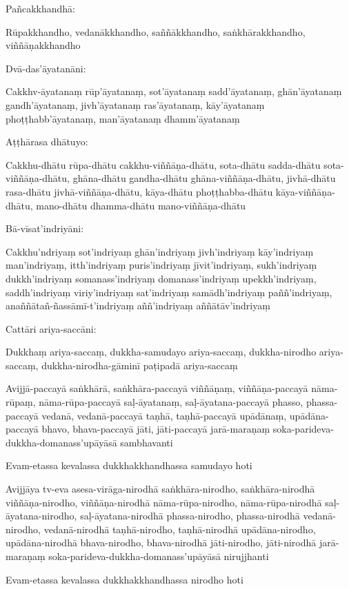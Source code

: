 \begin{paritta}

Pañcakkhandhā:

Rūpakkhandho, vedanākkhandho, saññākkhandho, saṅkhārakkhandho,
viññāṇakkhandho

Dvā-das'āyatanāni:

Cakkhv-āyatanaṃ rūp'āyatanaṃ, sot'āyatanaṃ sadd'āyatanaṃ, ghān'āyatanaṃ
gandh'āyatanaṃ, jivh'āyatanaṃ ras'āyatanaṃ, kāy'āyatanaṃ
phoṭṭhabb'āyatanaṃ, man'āyatanaṃ dhamm'āyatanaṃ

Aṭṭhārasa dhātuyo:

Cakkhu-dhātu rūpa-dhātu cakkhu-viññāṇa-dhātu, sota-dhātu sadda-dhātu
sota-viññāṇa-dhātu, ghāna-dhātu gandha-dhātu ghāna-viññāṇa-dhātu,
jivhā-dhātu rasa-dhātu jivhā-viññāṇa-dhātu, kāya-dhātu phoṭṭhabba-dhātu
kāya-viññāṇa-dhātu, mano-dhātu dhamma-dhātu mano-viññāṇa-dhātu

Bā-vīsat'indriyāni:

Cakkhu'ndriyaṃ sot'indriyaṃ ghān'indriyaṃ jivh'indriyaṃ kāy'indriyaṃ
man'indriyaṃ, itth'indriyaṃ puris'indriyaṃ jīvit'indriyaṃ, sukh'indriyaṃ
dukkh'indriyaṃ somanass'indriyaṃ domanass'indriyaṃ upekkh'indriyaṃ,
saddh'indriyaṃ viriy'indriyaṃ sat'indriyaṃ samādh'indriyaṃ
paññ'indriyaṃ, anaññātañ-ñassāmī-t'indriyaṃ aññ'indriyaṃ
aññātāv'indriyaṃ

Cattāri ariya-saccāni:

Dukkhaṃ ariya-saccaṃ, dukkha-samudayo ariya-saccaṃ, dukkha-nirodho
ariya-saccaṃ, dukkha-nirodha-gāminī paṭipadā ariya-saccaṃ

Avijjā-paccayā saṅkhārā, saṅkhāra-paccayā viññāṇaṃ, viññāṇa-paccayā
nāma-rūpaṃ, nāma-rūpa-paccayā saḷ-āyatanaṃ, saḷ-āyatana-paccayā phasso,
phassa-paccayā vedanā, vedanā-paccayā taṇhā, taṇhā-paccayā upādānaṃ,
upādāna-paccayā bhavo, bhava-paccayā jāti, jāti-paccayā jarā-maraṇaṃ
soka-parideva-dukkha-domanass'upāyāsā sambhavanti

Evam-etassa kevalassa dukkhakkhandhassa samudayo hoti

Avijjāya tv-eva asesa-virāga-nirodhā saṅkhāra-nirodho, saṅkhāra-nirodhā
viññāṇa-nirodho, viññāṇa-nirodhā nāma-rūpa-nirodho, nāma-rūpa-nirodhā
saḷ-āyatana-nirodho, saḷ-āyatana-nirodhā phassa-nirodho, phassa-nirodhā
vedanā-nirodho, vedanā-nirodhā taṇhā-nirodho, taṇhā-nirodhā
upādāna-nirodho, upādāna-nirodhā bhava-nirodho, bhava-nirodhā
jāti-nirodho, jāti-nirodhā jarā-maraṇaṃ
soka-parideva-dukkha-domanass'upāyāsā nirujjhanti

Evam-etassa kevalassa dukkhakkhandhassa nirodho hoti

\end{paritta}

